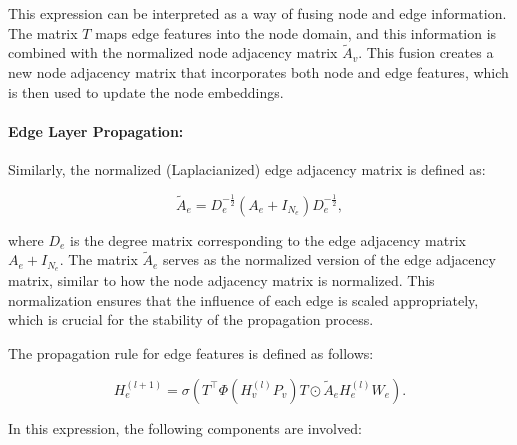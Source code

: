 This expression can be interpreted as a way of fusing node and edge information. The matrix \( T \) maps edge features into the node domain, and this information is combined with the normalized node adjacency matrix \( \tilde{A}_v \). This fusion creates a new node adjacency matrix that incorporates both node and edge features, which is then used to update the node embeddings.

\paragraph{Edge Layer Propagation:}

Similarly, the normalized (Laplacianized) edge adjacency matrix is defined as:

\begin{equation}
\tilde{A}_e = D_e^{-\frac{1}{2}} \left(A_e + I_{N_e}\right) D_e^{-\frac{1}{2}},
\end{equation}

where \( D_e \) is the degree matrix corresponding to the edge adjacency matrix \( A_e + I_{N_e} \). The matrix \( \tilde{A}_e \) serves as the normalized version of the edge adjacency matrix, similar to how the node adjacency matrix is normalized. This normalization ensures that the influence of each edge is scaled appropriately, which is crucial for the stability of the propagation process.

The propagation rule for edge features is defined as follows:

\begin{equation}
H^{(l+1)}_e = \sigma\left(T^\top \Phi\left(H^{(l)}_v P_v\right) T \odot \tilde{A}_e H^{(l)}_e W_e\right).
\end{equation}

In this expression, the following components are involved:


